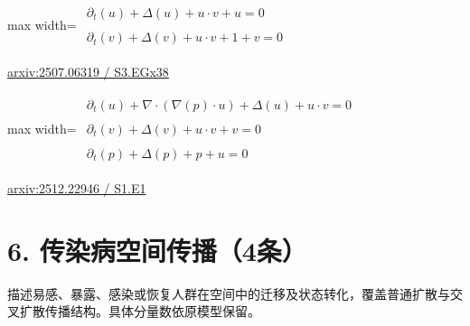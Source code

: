 \documentclass[UTF8,10pt,a4paper,fontset=mac]{ctexart}
\begin{document}
\begin{minipage}{\linewidth}\begin{center}\begin{adjustbox}{max width=\linewidth}$\displaystyle\begin{gathered}\begin{gathered}\partial_{t}(u)+\Delta(u)+u\cdot v+u=0\end{gathered}\\[5pt]\begin{gathered}\partial_{t}(v)+\Delta(v)+u\cdot v+1+v=0\end{gathered}\end{gathered}$\end{adjustbox}\end{center}{\small\href{https://arxiv.org/html/2507.06319#S3.EGx38}{arxiv:2507.06319 / S3.EGx38}}\par\end{minipage}\par\vspace{6mm}

\begin{minipage}{\linewidth}\begin{center}\begin{adjustbox}{max width=\linewidth}$\displaystyle\begin{gathered}\begin{gathered}\partial_{t}(u)+\nabla\cdot(\nabla(p)\cdot u)+\Delta(u)+u\cdot v=0\end{gathered}\\[5pt]\begin{gathered}\partial_{t}(v)+\Delta(v)+u\cdot v+v=0\end{gathered}\\[5pt]\begin{gathered}\partial_{t}(p)+\Delta(p)+p+u=0\end{gathered}\end{gathered}$\end{adjustbox}\end{center}{\small\href{https://arxiv.org/html/2512.22946#S1.E1}{arxiv:2512.22946 / S1.E1}}\par\end{minipage}\par\vspace{6mm}

\section*{6. 传染病空间传播（4条）}
描述易感、暴露、感染或恢复人群在空间中的迁移及状态转化，覆盖普通扩散与交叉扩散传播结构。具体分量数依原模型保留。\par\medskip
\end{document}
